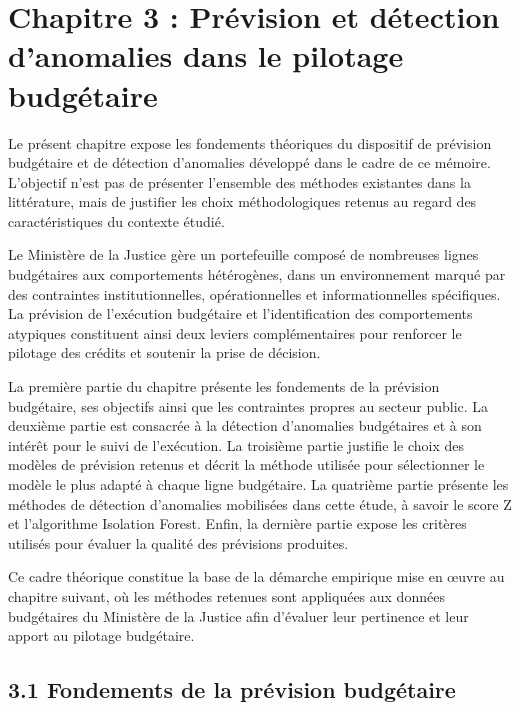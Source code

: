 \section*{Chapitre 3 : Pr\'evision et d\'etection d'anomalies dans le pilotage budg\'etaire}

\bigskip

Le présent chapitre expose les fondements théoriques du dispositif de prévision budgétaire et de détection d'anomalies développé dans le cadre de ce mémoire. L'objectif n'est pas de présenter l'ensemble des méthodes existantes dans la littérature, mais de justifier les choix méthodologiques retenus au regard des caractéristiques du contexte étudié.

Le Ministère de la Justice gère un portefeuille composé de nombreuses lignes budgétaires aux comportements hétérogènes, dans un environnement marqué par des contraintes institutionnelles, opérationnelles et informationnelles spécifiques. La prévision de l'exécution budgétaire et l'identification des comportements atypiques constituent ainsi deux leviers complémentaires pour renforcer le pilotage des crédits et soutenir la prise de décision.

La première partie du chapitre présente les fondements de la prévision budgétaire, ses objectifs ainsi que les contraintes propres au secteur public. La deuxième partie est consacrée à la détection d'anomalies budgétaires et à son intérêt pour le suivi de l'exécution. La troisième partie justifie le choix des modèles de prévision retenus et décrit la méthode utilisée pour sélectionner le modèle le plus adapté à chaque ligne budgétaire. La quatrième partie présente les méthodes de détection d'anomalies mobilisées dans cette étude, à savoir le score Z et l'algorithme Isolation Forest. Enfin, la dernière partie expose les critères utilisés pour évaluer la qualité des prévisions produites.

Ce cadre théorique constitue la base de la démarche empirique mise en œuvre au chapitre suivant, où les méthodes retenues sont appliquées aux données budgétaires du Ministère de la Justice afin d'évaluer leur pertinence et leur apport au pilotage budgétaire.

\subsection*{3.1 \quad Fondements de la pr\'evision budg\'etaire}

